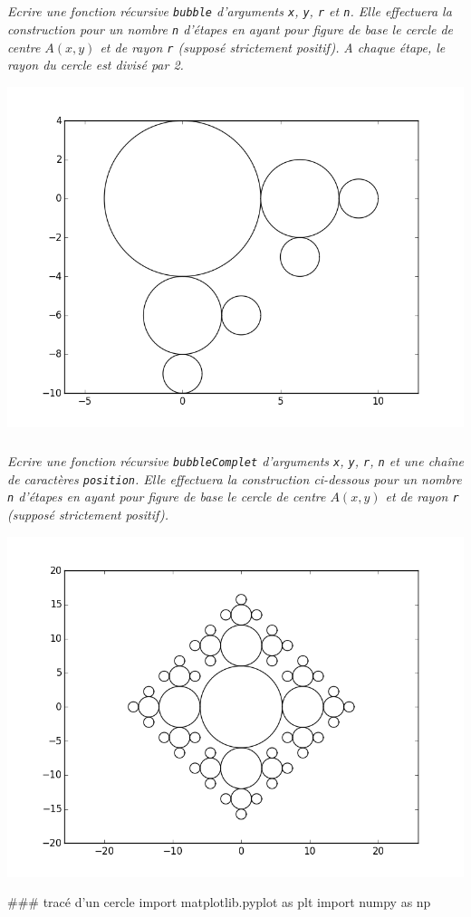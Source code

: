 \documentclass[10pt,fleqn]{article} %
\begin{document}
\begin{multicols}{2}
\subparagraph{}
\textit{Ecrire une fonction récursive \texttt{bubble} d'arguments \texttt{x}, \texttt{y}, \texttt{r} et \texttt{n}. Elle effectuera la construction pour un nombre \texttt{n} d'étapes en ayant pour figure de base le cercle de centre $A(x, y)$ et de rayon \texttt{r} (supposé strictement positif).}
\textit{A chaque étape, le rayon du cercle est divisé par 2.}
\begin{center}
\includegraphics[width=.65\linewidth]{images/fig_03}
\end{center}

\subparagraph{}
\textit{Ecrire une fonction récursive \texttt{bubbleComplet} d'arguments \texttt{x}, \texttt{y}, \texttt{r}, \texttt{n} et une chaîne de caractères \texttt{position}. Elle effectuera la construction ci-dessous pour un nombre \texttt{n} d'étapes en ayant pour figure de base le cercle de centre $A(x, y)$ et de rayon \texttt{r} (supposé strictement positif).}
\begin{center}
\includegraphics[width=.65\linewidth]{images/bulles}
\end{center}

\ifprof
\begin{corrige}
\begin{python}
### tracé d'un cercle
import matplotlib.pyplot as plt
import numpy as np


\end{python}
\end{corrige}
\end{multicols}
\end{document}
